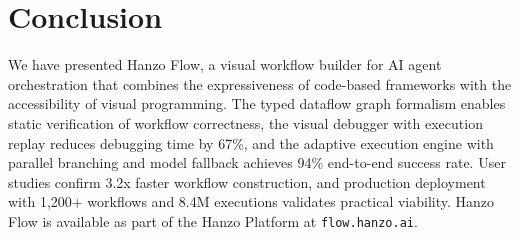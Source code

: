 \section{Conclusion}

\label{sec:conclusion}

We have presented Hanzo Flow, a visual workflow builder for AI agent orchestration that combines the expressiveness of code-based frameworks with the accessibility of visual programming. The typed dataflow graph formalism enables static verification of workflow correctness, the visual debugger with execution replay reduces debugging time by 67\%, and the adaptive execution engine with parallel branching and model fallback achieves 94\% end-to-end success rate. User studies confirm 3.2x faster workflow construction, and production deployment with 1,200+ workflows and 8.4M executions validates practical viability. Hanzo Flow is available as part of the Hanzo Platform at \texttt{flow.hanzo.ai}.

